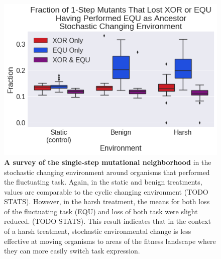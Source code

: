 \documentclass[10pt,letterpaper]{article}
\begin{document}
\begin{figure}[!h] %

\includegraphics[trim={0.2cm 0 0 0.2cm},clip,width=1\columnwidth]{figures/CSE_frac_1step__filtered__box.png}
\caption{{\bf A survey of the single-step mutational neighborhood} in the stochastic changing environment around organisms that performed the fluctuating task. Again, in the static and benign treatments, values are comparable to the cyclic changing environment (TODO STATS). However, in the harsh treatment, the means for both loss of the fluctuating task (EQU) and loss of both task were slight reduced. (TODO STATS). This result indicates that in the context of a harsh treatment, stochastic environmental change is less effective at moving organisms to areas of the fitness landscape where they can more easily switch task expression. %
}\label{fig:CSE_single_step}

\end{figure}
\end{document}
